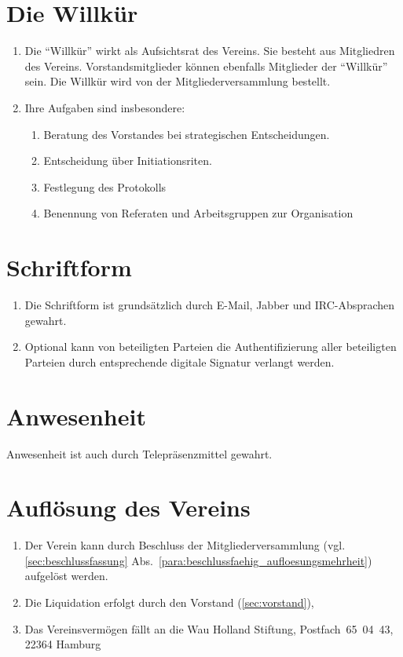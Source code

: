 \documentclass[a4paper]{article}
\begin{document}
\section{Die Willkür}\label{sec:die_willkuer}

\begin{enumerate}
\item Die "`Willkür"' wirkt als Aufsichtsrat des Vereins. Sie besteht aus Mitgliedren des Vereins. Vorstandsmitglieder können ebenfalls Mitglieder der "`Willkür"' sein. Die Willkür wird von der Mitgliederversammlung bestellt.
\item Ihre Aufgaben sind insbesondere:
\begin{enumerate}
\item Beratung des Vorstandes bei strategischen Entscheidungen.
\item Entscheidung über Initiationsriten.
\item Festlegung des Protokolls
\item Benennung von Referaten und Arbeitsgruppen zur Organisation
\end{enumerate}
\end{enumerate}


\section{Schriftform}\label{sec:schriftform}

\begin{enumerate}
\item Die Schriftform ist grundsätzlich durch E-Mail, Jabber und IRC-Absprachen gewahrt.
\item Optional kann von beteiligten Parteien die Authentifizierung aller beteiligten Parteien durch entsprechende digitale Signatur verlangt werden.
\end{enumerate}


\section{Anwesenheit}\label{sec:anwesenheit}

Anwesenheit ist auch durch Telepräsenzmittel gewahrt.


\section{Auflösung des Vereins}\label{sec:aufloesung_des_vereins}

\begin{enumerate}
\item Der Verein kann durch Beschluss der Mitgliederversammlung (vgl. \ref{sec:beschlussfassung} Abs.~\ref{para:beschlussfaehig_aufloesungsmehrheit}) aufgelöst werden.
\item Die Liquidation erfolgt durch den Vorstand (\ref{sec:vorstand}),
\item Das Vereinsvermögen fällt an die Wau Holland Stiftung, Postfach~65~04~43, 22364 Hamburg
\end{enumerate}
\end{document}
